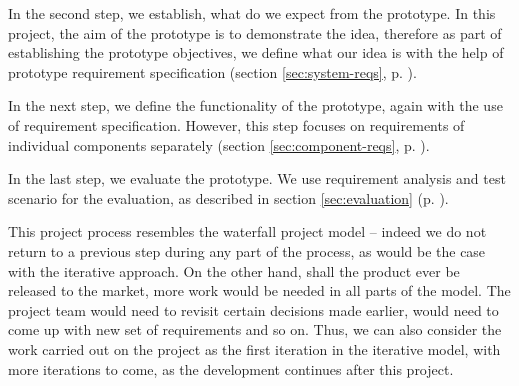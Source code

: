 In the second step, we establish, what do we expect from the prototype. In this project, the aim of the prototype is to demonstrate the idea, therefore as part of establishing the prototype objectives, we define what our idea is with the help of prototype requirement specification (section \ref{sec:system-reqs}, p. \pageref{sec:system-reqs}). 

In the next step, we define the functionality of the prototype, again with the use of requirement specification. However, this step focuses on requirements of individual components separately (section \ref{sec:component-reqs}, p. \pageref{sec:component-reqs}).

In the last step, we evaluate the prototype. We use requirement analysis and test scenario for the evaluation, as described in section \ref{sec:evaluation} (p. \pageref{sec:evaluation}).

This project process resembles the waterfall project model -- indeed we do not return to a previous step during any part of the process, as would be the case with the iterative approach. On the other hand, shall the product ever be released to the market, more work would be needed in all parts of the model. The project team would need to revisit certain decisions made earlier, would need to come up with new set of requirements and so on. Thus, we can also consider the work carried out on the project as the first iteration in the iterative model, with more iterations to come, as the development continues after this project.